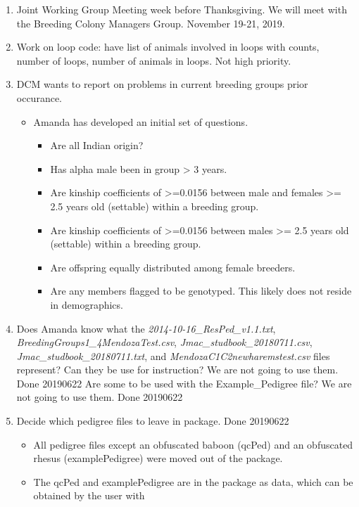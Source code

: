 \documentclass[
]{article}
\providecommand{\tightlist}{%
  \setlength{\itemsep}{0pt}\setlength{\parskip}{0pt}}
\begin{document}
\begin{enumerate}
\def\labelenumi{\arabic{enumi}.}
\item
  Joint Working Group Meeting week before Thanksgiving. We will meet
  with the Breeding Colony Managers Group. November 19-21, 2019.
\item
  Work on loop code: have list of animals involved in loops with counts,
  number of loops, number of animals in loops. Not high priority.
\item
  DCM wants to report on problems in current breeding groups prior
  occurance.

  \begin{itemize}
  \tightlist
  \item
    Amanda has developed an initial set of questions.

    \begin{itemize}
    \tightlist
    \item
      Are all Indian origin?
    \item
      Has alpha male been in group \textgreater{} 3 years.
    \item
      Are kinship coefficients of \textgreater=0.0156 between male and
      females \textgreater= 2.5 years old (settable) within a breeding
      group.
    \item
      Are kinship coefficients of \textgreater=0.0156 between males
      \textgreater= 2.5 years old (settable) within a breeding group.
    \item
      Are offspring equally distributed among female breeders.
    \item
      Are any members flagged to be genotyped. This likely does not
      reside in demographics.
    \end{itemize}
  \end{itemize}
\item
  Does Amanda know what the \emph{2014-10-16\_ResPed\_v1.1.txt},
  \emph{BreedingGroups1\_4MendozaTest.csv},
  \emph{Jmac\_studbook\_20180711.csv},
  \emph{Jmac\_studbook\_20180711.txt}, and
  \emph{MendozaC1C2newharemstest.csv} files represent? Can they be use
  for instruction? We are not going to use them. Done 20190622 Are some
  to be used with the Example\_Pedigree file? We are not going to use
  them. Done 20190622
\item
  Decide which pedigree files to leave in package. Done 20190622

  \begin{itemize}
  \tightlist
  \item
    All pedigree files except an obfuscated baboon (qcPed) and an
    obfuscated rhesus (examplePedigree) were moved out of the package.
  \item
    The qcPed and examplePedigree are in the package as data, which can
    be obtained by the user with


\end{itemize}
\end{enumerate}
\end{document}
